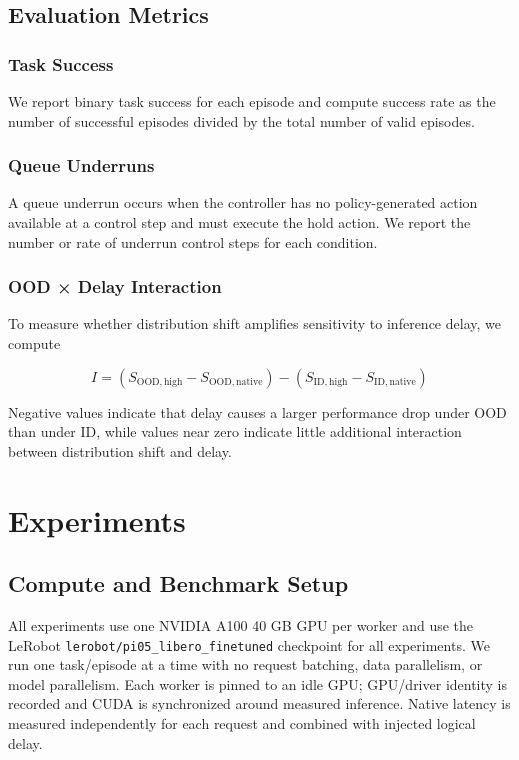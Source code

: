 \documentclass{article}
\begin{document}
\subsection{Evaluation Metrics}
\subsubsection{Task Success}
We report binary task success for each episode and compute success rate as the number of successful episodes divided by the total number of valid episodes.
\subsubsection{Queue Underruns}
A queue underrun occurs when the controller has no policy-generated action available at a control step and must execute the hold action. We report the number or rate of underrun control steps for each condition.
\subsubsection{OOD × Delay Interaction}
To measure whether distribution shift amplifies sensitivity to inference delay, we compute

\[
I =
\left(
S_{\mathrm{OOD,high}}
-
S_{\mathrm{OOD,native}}
\right)
-
\left(
S_{\mathrm{ID,high}}
-
S_{\mathrm{ID,native}}
\right)
\]

Negative values indicate that delay causes a larger performance drop under OOD than under ID, while values near zero indicate little additional interaction between distribution shift and delay.

\section{Experiments}
\label{headings}

\subsection{Compute and Benchmark Setup}
All experiments use one NVIDIA A100 40 GB GPU per worker and use the LeRobot \texttt{lerobot/pi05\_libero\_finetuned} checkpoint for all experiments. We
run one task/episode at a time with no request batching, data
parallelism, or model parallelism. Each worker is pinned to an idle
GPU; GPU/driver identity is recorded and CUDA is synchronized
around measured inference. Native latency is measured independently for each request and combined with injected logical delay.
\end{document}
